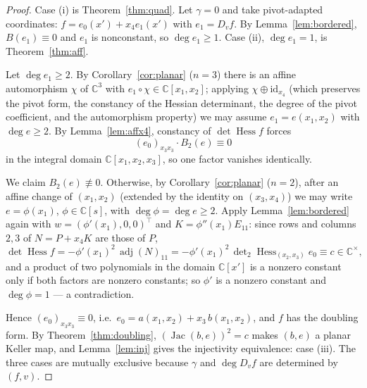 \documentclass[11pt]{article}
\theoremstyle{plain}
\theoremstyle{definition}
\newcommand{\C}{\mathbb{C}}
\newcommand{\Hess}{\operatorname{Hess}}
\newcommand{\adj}{\operatorname{adj}}
\newcommand{\Jac}{\operatorname{Jac}}
\begin{document}
\begin{proof}
Case (i) is Theorem~\ref{thm:quad}. Let $\gamma=0$ and take
pivot-adapted coordinates: $f=e_0(x')+x_4e_1(x')$ with $e_1=D_vf$. By
Lemma~\ref{lem:bordered}, $B(e_1)\equiv0$ and $e_1$ is nonconstant, so
$\deg e_1\ge1$. Case (ii), $\deg e_1=1$, is Theorem~\ref{thm:aff}.

Let $\deg e_1\ge2$. By Corollary~\ref{cor:planar} ($n=3$) there is an
affine automorphism $\chi$ of $\C^3$ with $e_1\circ\chi\in\C[x_1,x_2]$;
applying $\chi\oplus\mathrm{id}_{x_4}$ (which preserves the pivot form,
the constancy of the Hessian determinant, the degree of the pivot
coefficient, and the automorphism property) we may assume
$e_1=e(x_1,x_2)$ with $\deg e\ge2$. By Lemma~\ref{lem:affx4}, constancy
of $\det\Hess f$ forces
\[
(e_0)_{x_3x_3}\cdot B_2(e)\equiv0
\]
in the integral domain $\C[x_1,x_2,x_3]$, so one factor vanishes
identically.

We claim $B_2(e)\not\equiv0$. Otherwise, by Corollary~\ref{cor:planar}
($n=2$), after an affine change of $(x_1,x_2)$ (extended by the identity
on $(x_3,x_4)$) we may write $e=\phi(x_1)$, $\phi\in\C[s]$, with
$\deg\phi=\deg e\ge2$. Apply Lemma~\ref{lem:bordered} again with
$w=(\phi'(x_1),0,0)^{\top}$ and $K=\phi''(x_1)E_{11}$: since rows and
columns $2,3$ of $N=P+x_4K$ are those of $P$,
\[
\det\Hess f=-\phi'(x_1)^2\,\adj(N)_{11}
=-\phi'(x_1)^2\,\det\nolimits_2\Hess_{(x_2,x_3)}e_0\equiv c\in\C^{\times},
\]
and a product of two polynomials in the domain $\C[x']$ is a nonzero
constant only if both factors are nonzero constants; so $\phi'$ is a
nonzero constant and $\deg\phi=1$ --- a contradiction.

Hence $(e_0)_{x_3x_3}\equiv0$, i.e.\ $e_0=a(x_1,x_2)+x_3\,b(x_1,x_2)$,
and $f$ has the doubling form. By Theorem~\ref{thm:doubling},
$(\Jac(b,e))^2=c$ makes $(b,e)$ a planar Keller map, and
Lemma~\ref{lem:inj} gives the injectivity equivalence: case (iii). The
three cases are mutually exclusive because $\gamma$ and $\deg D_vf$ are
determined by $(f,v)$.
\end{proof}
\end{document}
